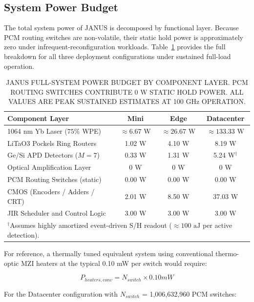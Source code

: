 \documentclass[journal]{IEEEtran}
\begin{document}
\subsection{\textbf{System Power Budget}}

The total system power of JANUS is decomposed by functional layer. Because PCM routing switches are non-volatile, their static hold power is approximately zero under infrequent-reconfiguration workloads. Table~\ref{tab:table15} provides the full breakdown for all three deployment configurations under sustained full-load operation.

\begin{table}[htbp]
\centering
\small
\setlength{\tabcolsep}{1pt}
\caption{JANUS FULL-SYSTEM POWER BUDGET BY COMPONENT LAYER. PCM ROUTING SWITCHES CONTRIBUTE 0 W STATIC HOLD POWER. ALL VALUES ARE PEAK SUSTAINED ESTIMATES AT 100 GHz OPERATION.}
\label{tab:table15}
\begin{tabular}{lccc}
\toprule
Component Layer & Mini & Edge & Datacenter \\
\midrule
1064 nm Yb Laser ($75\%$ WPE) & $\approx 6.67\text{ W}$ & $\approx 26.67\text{ W}$ & $\approx 133.33\text{ W}$ \\
LiTaO3 Pockels Ring Routers & 1.02 W & 4.10 W & 8.19 W \\
Ge/Si APD Detectors ($M = 7$) & 0.33 W & 1.31 W & 5.24 W$^\dagger$ \\
Optical Amplification Layer & 0 W & 0 W & 0 W \\
PCM Routing Switches (static) & 0.00 W & 0.00 W & 0.00 W \\
CMOS (Encoders / Adders / CRT) & 2.01 W & 8.50 W & 37.03 W \\
JIR Scheduler and Control Logic & 3.00 W & 3.00 W & 3.00 W \\
\bottomrule
\multicolumn{4}{l}{\scriptsize $^\dagger$Assumes highly amortized event-driven S/H readout ($\approx 100\text{ aJ}$ per active detection).} \\
\end{tabular}
\end{table}

For reference, a thermally tuned equivalent system using conventional thermo-optic MZI heaters at the typical 0.10 mW per switch would require:

\begin{equation}
P_{heaters,conv} = N_{switch} \times 0.10 mW
\end{equation}

For the Datacenter configuration with $N_{switch}$ = 1,006,632,960 PCM switches:
\end{document}
